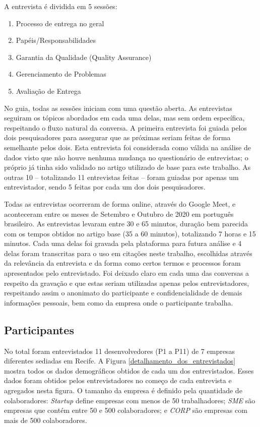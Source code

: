 A entrevista é dividida em 5 sessões: 

\begin{enumerate}
\item Processo de entrega no geral
\item Papéis/Responsabilidades
\item Garantia da Qualidade (Quality Assurance)
\item Gerenciamento de Problemas
\item Avaliação de Entrega
\end{enumerate}

No guia, todas as sessões iniciam com uma questão aberta. As entrevistas seguiram os tópicos abordados em cada uma delas, mas sem ordem específica, respeitando o fluxo natural da conversa. A primeira entrevista foi guiada pelos dois pesquisadores para assegurar que as próximas seriam feitas de forma semelhante pelos dois. Esta entrevista foi considerada como válida na análise de dados visto que não houve nenhuma mudança no questionário de entrevistas; o próprio já tinha sido validado no artigo utilizado de base para este trabalho. As outras 10 -- totalizando 11 entrevistas feitas -- foram guiadas por apenas um entrevistador, sendo 5 feitas por cada um dos dois pesquisadores.

Todas as entrevistas ocorreram de forma online, através do Google Meet, e aconteceram entre os meses de Setembro e Outubro de 2020 em português brasileiro. As entrevistas levaram entre 30 e 65 minutos, duração bem parecida com os tempos obtidos no artigo base (35 a 60 minutos), totalizando 7 horas e 15 minutos. Cada uma delas foi gravada pela plataforma para futura análise e 4 delas foram transcritas para o uso em citações neste trabalho, escolhidas através da relevância da entrevista e da forma como certos termos e processos foram apresentados pelo entrevistado. Foi deixado claro em cada uma das conversas a respeito da gravação e que estas seriam utilizadas apenas pelos entrevistadores, respeitando assim o anonimato do participante e confidencialidade de demais informações pessoais, bem como da empresa onde o participante trabalha.

\subsection{Participantes}

No total foram entrevistados 11 desenvolvedores (P1 a P11) de 7 empresas diferentes sediadas em Recife. A Figura \ref{detalhamento_dos_entrevistados} mostra todos os dados demográficos obtidos de cada um dos entrevistados. Esses dados foram obtidos pelos entrevistadores no começo de cada entrevista e agregados nesta figura. O tamanho da empresa é definido pela quantidade de colaboradores: \emph{Startup} define empresas com menos de 50 trabalhadores; \emph{SME} são empresas que contém entre 50 e 500 colaboradores; e \emph{CORP} são empresas com mais de 500 colaboradores.


